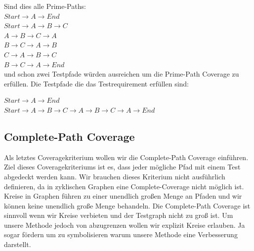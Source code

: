 
Sind dies alle Prime-Paths: \\

$ Start \rightarrow  A \rightarrow  End$ \\
$ Start \rightarrow A \rightarrow B \rightarrow C$ \\
$ A \rightarrow B \rightarrow C \rightarrow A $ \\
$ B \rightarrow C \rightarrow A \rightarrow B $ \\
$ C \rightarrow A \rightarrow B \rightarrow C $ \\
$ B \rightarrow C \rightarrow A \rightarrow End $ \\

und schon zwei Testpfade würden ausreichen um die Prime-Path Coverage zu erfüllen.
Die Testpfade die das Testrequirement erfüllen sind:

$Start \rightarrow A \rightarrow End$ \\
$Start \rightarrow A \rightarrow B \rightarrow C \rightarrow A \rightarrow B \rightarrow C \rightarrow A \rightarrow End$

\subsection{Complete-Path Coverage}

Als letztes Coveragekriterium wollen wir die Complete-Path Coverage einführen.
Ziel dieses Coveragekriteriums ist es, dass jeder mögliche Pfad mit einem Test abgedeckt werden kann.
Wir brauchen dieses Kriterium nicht ausführlich definieren, da in zyklischen Graphen eine Complete-Coverage nicht möglich ist.
Kreise in Graphen führen zu einer unendlich großen Menge an Pfaden und wir können keine unendlich große Menge behandeln.
Die Complete-Path Coverage ist sinnvoll wenn wir Kreise verbieten und der Testgraph nicht zu groß ist.
Um unsere Methode jedoch von \cite[Property-based Testing]{property-based-testing} abzugrenzen wollen wir explizit Kreise erlauben.
Ja sogar fördern um zu symbolisieren warum unsere Methode eine Verbesserung darstellt.

